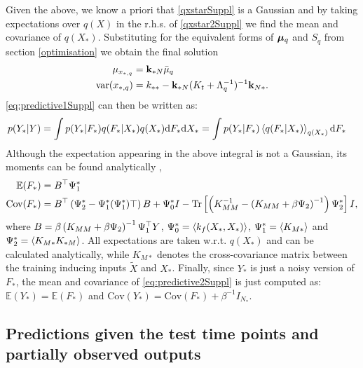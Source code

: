 \documentclass{article} %
\begin{document}
Given the above, we know a priori that \eqref{qxstarSuppl} is a Gaussian and by taking expectations over $q(X)$ in the r.h.s. of \eqref{qxstar2Suppl} we find the mean and covariance of $q(X_*)$. Substituting for the equivalent forms of $\boldsymbol \mu_q$ and $S_q$ from section \ref{optimisation} we obtain the final solution
%
\begin{align}
 \mu_{x_{*,q}} = {}& \mathbf{k}_{*N} \bar{\mu}_q \\
  \text{var}(x_{*,q}) = {}& k_{**} - \mathbf{k}_{*N} (K_t + \Lambda_q^{-1})^{-1} \mathbf{k}_{N*}.
\end{align}
%
\eqref{eq:predictive1Suppl} can then be written as:
\begin{align} 
p(Y_*| Y) {}& =  \int p(Y_*| F_*)  q(F_*|X_*) q(X_*) \text{d}  F_* \text{d}  X_* = \int p(Y_* | F_*) \left\langle q(F_* | X_*) \right\rangle_{q(X_*)} \text{d}  F_* \label{eq:predictive2Suppl}
\end{align}
%
Although the expectation appearing in the above integral is not a Gaussian, its moments can be found analytically \cite{rasmussen-williams, Girard03gaussianprocess},
%
\begin{align}
 \mathbb{E}(F_*) ={}&  B^{\top} \Psi_1^* \label{meanFstarSuppl} \\
 \text{Cov}(F_*) ={}& B^{\top} \left( \Psi_2^* - \Psi_1^* (\Psi_1^*){\top} \right) B + \Psi_0^* I - \text{Tr} \left[ \left( K_{MM}^{-1} - \left( K_{MM} + \beta \Psi_2 \right)^{-1} \right) \Psi_2^* \right] I,
\end{align}
%
where $B = \beta \left( K_{MM} + \beta \Psi_2 \right)^{-1} \Psi_1^{\top}
Y$, $\Psi_0^* = \left\langle k_f(X_*, X_*) \right\rangle$, $\Psi_1^* = \left\langle K_{M*} \right\rangle$
and $\Psi_2^* = \left\langle K_{M*} K_{*M} \right\rangle$. All expectations are taken
w.r.t. $q(X_*)$ and can be calculated analytically, while $K_{M*}$
denotes the cross-covariance matrix between the training inducing
inputs $\tilde{X}$ and $X_*$. Finally, since $Y_*$ is just a noisy version of
$F_*$, the mean and covariance of \eqref{eq:predictive2Suppl} is just
computed as: $\mathbb{E}(Y_*) = \mathbb{E}(F_*)$ and $\text{Cov}(Y_*)
= \text{Cov}(F_*) + \beta^{-1} I_{N_*}$.


\subsection{Predictions given the test time points and partially observed outputs}
\end{document}
